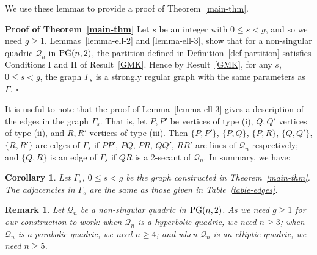 \documentclass[12pt]{article}
\newtheorem{corollary}[theorem]{Corollary}
\newtheorem{remark}[theorem]{Remark}
\newcommand{\X}{\mathcal X}
\newcommand{\Y}{\mathcal Y}
\newcommand\E{{\cal E}}
\newcommand{\Q}{\mathscr Q}
\newcommand\PG{{\rm PG}}
\newcommand{\Label}{\label}
\begin{document}
We use these lemmas to provide a proof of Theorem~\ref{main-thm}.

{\bf Proof of Theorem~\ref{main-thm}} Let $s$ be an integer with  $0\le s <g$, and so we need $g\ge 1$. 
Lemmas~\ref{lemma-ell-2} and \ref{lemma-ell-3}, show that for a non-singular quadric $\Q_n$ in $\PG(n,2)$, the partition defined in Definition~\ref{def-partition} satisfies Conditions I and II of Result~\ref{GMK}. Hence by Result~\ref{GMK}, for any  $s$, $0\leq s<g$, the graph  $\Gamma_{s}$  is a strongly regular graph with the same parameters as $\Gamma$. \hfill $\square$ 


It is useful to note that the proof of Lemma~\ref{lemma-ell-3} gives a description of  the edges in the graph $\Gamma_s$. That is, let  $P,P'$ be vertices of type (i), $Q,Q'$ 
 vertices of type (ii), and
$R,R'$ 
 vertices of type (iii). Then $\{P,P'\}$, $\{P,Q\}$, $\{P,R\}$, $\{Q,Q'\}$, $\{R,R'\}$ are edges of $\Gamma_s$ if $PP'$, $PQ$, $PR$, $QQ'$, $RR'$ are lines of $\Q_n$ respectively; and $\{Q,R\}$ is an edge of $\Gamma_s$ if $QR$ is a 2-secant of $\Q_n$. In summary, we have:


\begin{corollary}\Label{cor-edges} Let $\Gamma_s$, $0\leq s<g$  be the graph constructed in Theorem~\ref{main-thm}. The adjacencies in $\Gamma_s$ are the same as those given in Table~\ref{table-edges}.  
\end{corollary}


%



\begin{remark}
{\rm  Let $\Q_n$ be a non-singular  quadric in $\PG(n,2)$. As we need $g\geq1$ for our construction to work:  when $\Q_n$ is a hyperbolic quadric,  we need $n\ge 3$; when $\Q_n$ is a parabolic quadric, we need $n\ge 4$; and when $\Q_n$ is an elliptic quadric, we need $n\ge 5$.
}\end{remark}
\end{document}
